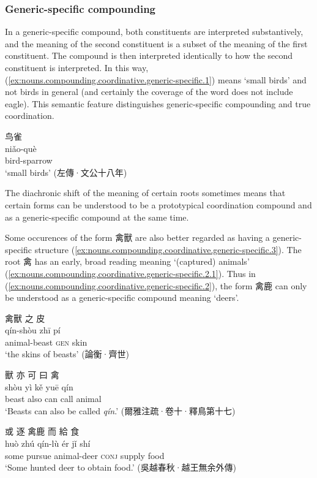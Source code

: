 \documentclass[UTF8, a4paper, oneside, scheme=plain, 12pt]{ctexrep}
\newcommand{\form}[1]{\emph{#1}}
\newcommand{\translate}[1]{`#1'}
\newcommand*{\category}[1]{\textsc{#1}}
\begin{document}
\subsubsection{Generic-specific compounding}

In a generic-specific compound, both constituents are interpreted substantively,
and the meaning of the second constituent is a subset of the meaning of the first constituent.
The compound is then interpreted identically to how the second constituent is interpreted.
In this way, (\ref{ex:nouns.compounding.coordinative.generic-specific.1})
means \translate{small birds} and not birds in general
(and certainly the coverage of the word does not include eagle).
This semantic feature distinguishes generic-specific compounding and true coordination.

\begin{exe}
    \ex\label{ex:nouns.compounding.coordinative.generic-specific.1}
    \glll 鸟雀 \\
    niǎo-què \\
    bird-sparrow \\
    \glt\translate{small birds} \hfill (左傳·文公十八年)
\end{exe}

The diachronic shift of the meaning of certain roots sometimes means that 
certain forms can be understood to be a prototypical coordination compound 
and as a generic-specific compound at the same time.

Some occurences of the form 禽獸 are also better regarded as having a generic-specific structure (\ref{ex:nouns.compounding.coordinative.generic-specific.3}).
The root 禽 has an early, broad reading meaning \translate{(captured) animals} (\ref{ex:nouns.compounding.coordinative.generic-specific.2.1}).
Thus in (\ref{ex:nouns.compounding.coordinative.generic-specific.2}),
the form 禽鹿 can only be understood as a generic-specific compound meaning \translate{deers}.

\begin{exe}
    \ex\label{ex:nouns.compounding.coordinative.generic-specific.3}
    \glll 禽獸 之 皮 \\
    qín-shòu zhī pí \\
    animal-beast \category{gen} skin \\
    \glt\translate{the skins of beasts} \hfill (論衡·齊世)

    \ex\label{ex:nouns.compounding.coordinative.generic-specific.2.1}
    \glll 獸 亦 可 曰 禽 \\
    shòu yì kě yuē qín \\
    beast also can call animal \\
    \glt\translate{Beasts can also be called \form{qín}.} \hfill (爾雅注疏·卷十·釋鳥第十七)

    \ex\label{ex:nouns.compounding.coordinative.generic-specific.2}
    \glll 或 逐 禽鹿 而 給 食 \\
    huò zhú qín-lù ér jǐ shí \\
    some pursue animal-deer \category{conj} supply food \\
    \glt\translate{Some hunted deer to obtain food.} \hfill (吳越春秋·越王無余外傳)
\end{exe}
\end{document}

